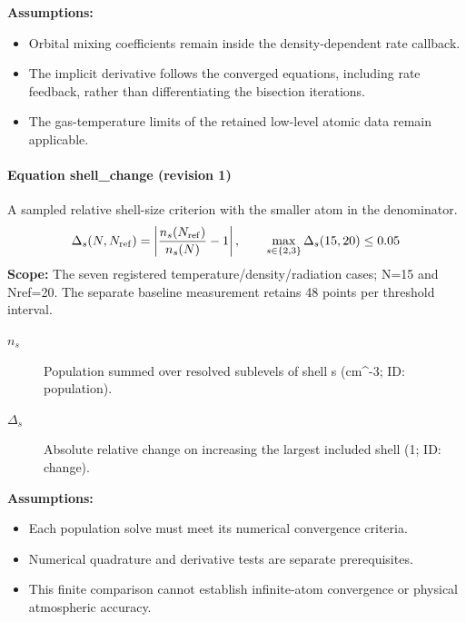 \noindent\textbf{Assumptions:}
\begin{itemize}
\item Orbital mixing coefficients remain inside the density-dependent rate callback.
\item The implicit derivative follows the converged equations, including rate feedback, rather than differentiating the bisection iterations.
\item The gas-temperature limits of the retained low-level atomic data remain applicable.
\end{itemize}

\paragraph{Equation shell\_change (revision 1)}
A sampled relative shell-size criterion with the smaller atom in the denominator.
\begin{equation}
\begin{aligned}
\Delta_s(N,N_{\rm ref})=\left|\frac{n_s(N_{\rm ref})}{n_s(N)}-1\right|,\qquad\max_{s\in\{2,3\}}\Delta_s(15,20)\le0.05
\end{aligned}
\label{eq:escape.atom_5f_convergence:shell_5f_change:1}
\end{equation}
\noindent\textbf{Scope:} The seven registered temperature/density/radiation cases; N=15 and Nref=20. The separate baseline measurement retains 48 points per threshold interval.

\begin{description}
\item[$n_s$] Population summed over resolved sublevels of shell s (cm\textasciicircum{}-3; ID: population).
\item[$\Delta_s$] Absolute relative change on increasing the largest included shell (1; ID: change).
\end{description}

\noindent\textbf{Assumptions:}
\begin{itemize}
\item Each population solve must meet its numerical convergence criteria.
\item Numerical quadrature and derivative tests are separate prerequisites.
\item This finite comparison cannot establish infinite-atom convergence or physical atmospheric accuracy.
\end{itemize}
